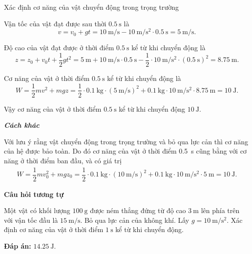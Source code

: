 \begin{dang}{Xác định cơ năng của vật chuyển động trong trọng trường}
{		Vận tốc của vật đạt được sau thời $\SI{0,5}{\second}$ là
		\begin{equation*}
			v=v_0+gt=\SI{10}{\meter/\second}-\SI{10}{\meter/\second^2}\cdot\SI{0,5}{\second}=\SI{5}{\meter/\second}.
		\end{equation*}
		
		Độ cao của vật đạt được ở thời điểm $\SI{0,5}{\second}$ kể từ khi chuyển động là
		\begin{equation*}
			z=z_0+v_0t+\dfrac{1}{2}gt^2=\SI{5}{\meter}+\SI{10}{\meter/\second}\cdot\SI{0,5}{\second}-\dfrac{1}{2}\cdot\SI{10}{\meter/\second^2}\cdot(\SI{0,5}{\second})^2=\SI{8,75}{\meter}.
		\end{equation*}
		
		Cơ năng của vật ở thời điểm $\SI{0,5}{\second}$ kể từ khi chuyển động là
		\begin{equation*}
			W=\dfrac{1}{2}mv^2+mgz=\dfrac{1}{2}\cdot\SI{0,1}{\kilogram}\cdot(\SI{5}{\meter/\second})^2+\SI{0,1}{\kilogram}\cdot\SI{10}{\meter/\second^2}\cdot\SI{8,75}{\meter}=\SI{10}{\joule}.
		\end{equation*}
		
		Vậy cơ năng của vật ở thời điểm $\SI{0,5}{\second}$ kể từ khi chuyển động $\SI{10}{\joule}$.
		
		\textbf{\textit{Cách khác}} 
		
		Với lưu ý rằng vật chuyển động trong trọng trường và bỏ qua lực cản thì cơ năng của hệ được bảo toàn. Do đó cơ năng của vật ở thời điểm \SI{0.5}{\second} cũng bằng với cơ năng ở thời điểm ban đầu, và có giá trị 
		\begin{align*}
			W=\dfrac{1}{2}mv_0^2+mgz_0=\dfrac{1}{2}\cdot\SI{0.1}{\kilogram}\cdot(\SI{10}{\meter/\second})^2+\SI{0.1}{\kilogram}\cdot\SI{10}{\meter/\second^2}\cdot\SI{5}{\meter}=\SI{10}{\joule}.
		\end{align*}
		
		\begin{center}
			\textbf{Câu hỏi tương tự}
		\end{center}
		
		Một vật có khối lượng $\SI{100}{\gram}$ được ném thẳng đứng từ độ cao $\SI{3}{\meter}$ lên phía trên với vận tốc đầu là $\SI{15}{\meter/\second}$. Bỏ qua lực cản của không khí. Lấy $g=\SI{10}{\meter/\second^2}$. Xác định cơ năng của vật ở thời điểm $\SI{1}{\second}$ kể từ khi chuyển động.
		
		\textbf{Đáp án:} $\SI{14.25}{\joule}$.
	}
\end{dang}


